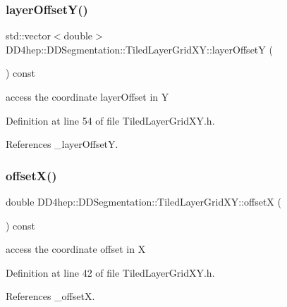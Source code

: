 \subsubsection{\texorpdfstring{layer\+Offset\+Y()}{layerOffsetY()}}
{\footnotesize\ttfamily std\+::vector$<$double$>$ D\+D4hep\+::\+D\+D\+Segmentation\+::\+Tiled\+Layer\+Grid\+X\+Y\+::layer\+OffsetY (\begin{DoxyParamCaption}{ }\end{DoxyParamCaption}) const\hspace{0.3cm}{\ttfamily [inline]}}



access the coordinate layer\+Offset in Y 



Definition at line 54 of file Tiled\+Layer\+Grid\+X\+Y.\+h.



References \+\_\+layer\+OffsetY.

\hypertarget{class_d_d4hep_1_1_d_d_segmentation_1_1_tiled_layer_grid_x_y_ab3a933ea8f4ae73a4cd0338a9db27532}{}\label{class_d_d4hep_1_1_d_d_segmentation_1_1_tiled_layer_grid_x_y_ab3a933ea8f4ae73a4cd0338a9db27532} 
\subsubsection{\texorpdfstring{offset\+X()}{offsetX()}}
{\footnotesize\ttfamily double D\+D4hep\+::\+D\+D\+Segmentation\+::\+Tiled\+Layer\+Grid\+X\+Y\+::offsetX (\begin{DoxyParamCaption}{ }\end{DoxyParamCaption}) const\hspace{0.3cm}{\ttfamily [inline]}}



access the coordinate offset in X 



Definition at line 42 of file Tiled\+Layer\+Grid\+X\+Y.\+h.



References \+\_\+offsetX.

\hypertarget{class_d_d4hep_1_1_d_d_segmentation_1_1_tiled_layer_grid_x_y_a47313975940c28c394e6496f706ae0be}{}\label{class_d_d4hep_1_1_d_d_segmentation_1_1_tiled_layer_grid_x_y_a47313975940c28c394e6496f706ae0be} 
